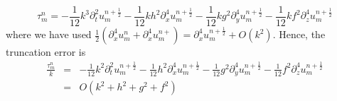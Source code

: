 \begin{equation*}
\tau_m^n = -\frac{1}{12} k^3 \partial_t^2 u_m^{n+\frac{1}{2}} - \frac{1}{12} k h^2 \partial_x^4 u_m^{n+\frac{1}{2}} - \frac{1}{12} k g^2 \partial_y^4 u_m^{n+\frac{1}{2}} - \frac{1}{12} k f^2 \partial_z^4 u_m^{n+\frac{1}{2}}
\end{equation*}
where we have used $\frac{1}{2}(\partial_x^4 u_m^n + \partial_x^4 u_m^{n+}) = \partial_x^4 u_m^{n+\frac{1}{2}} + O(k^2)$. Hence, the truncation error is 
\begin{eqnarray*}
\frac{\tau_m^ n}{k} &=& -\frac{1}{12} k^2 \partial_t^2 u_m^{n+\frac{1}{2}} - \frac{1}{12} h^2 \partial_x^4 u_m^{n+\frac{1}{2}} - \frac{1}{12} g^2 \partial_y^4 u_m^{n+\frac{1}{2}} - \frac{1}{12} f^2 \partial_z^4 u_m^{n+\frac{1}{2}}\\
					&=& O(k^2 + h^2 + g^2 + f^2)
\end{eqnarray*}

